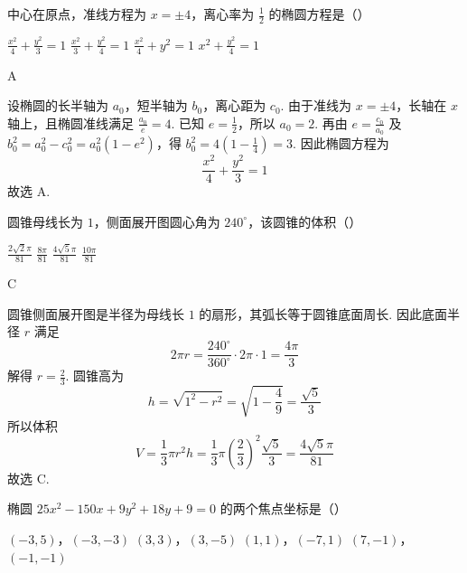 \begin{problem}
中心在原点，准线方程为 \(x = \pm 4\)，离心率为 \(\frac{1}{2}\) 的椭圆方程是（\quad）

\choices
    {\(\frac{x^2}{4} +\frac{y^2}{3} = 1\)}
    {\(\frac{x^2}{3} +\frac{y^2}{4} = 1\)}
    {\(\frac{x^2}{4} + y^2 = 1\)}
    {\(x^2 + \frac{y^2}{4} = 1\)}
\end{problem}

\begin{answer}
A
\end{answer}

\begin{solution}
设椭圆的长半轴为 \(a_0\)，短半轴为 \(b_0\)，离心距为 \(c_0\). 由于准线为 \(x=\pm4\)，长轴在 \(x\) 轴上，且椭圆准线满足 \(\frac{a_0}{e}=4\). 已知 \(e=\frac12\)，所以 \(a_0=2\). 再由 \(e=\frac{c_0}{a_0}\) 及 \(b_0^2=a_0^2-c_0^2=a_0^2(1-e^2)\)，得 \(b_0^2=4\left(1-\frac14\right)=3\). 因此椭圆方程为
\[
\frac{x^2}{4}+\frac{y^2}{3}=1
\]
故选 A.
\end{solution}

\begin{problem}
圆锥母线长为 \(1\)，侧面展开图圆心角为 \(240^{\circ}\)，该圆锥的体积（\quad）

\choices
    {\(\frac{2\sqrt{2}\pi}{81}\)}
    {\(\frac{8\pi}{81}\)}
    {\(\frac{4\sqrt{5}\pi}{81}\)}
    {\(\frac{10\pi}{81}\)}
\end{problem}

\begin{answer}
C
\end{answer}

\begin{solution}
圆锥侧面展开图是半径为母线长 \(1\) 的扇形，其弧长等于圆锥底面周长. 因此底面半径 \(r\) 满足
\[
2\pi r=\frac{240^{\circ}}{360^{\circ}}\cdot2\pi\cdot1=\frac{4\pi}{3}
\]
解得 \(r=\frac{2}{3}\). 圆锥高为
\[
h=\sqrt{1^2-r^2}=\sqrt{1-\frac{4}{9}}=\frac{\sqrt{5}}{3}
\]
所以体积
\[
V=\frac{1}{3}\pi r^2h=\frac{1}{3}\pi\left(\frac{2}{3}\right)^2\frac{\sqrt{5}}{3}=\frac{4\sqrt{5}\pi}{81}
\]
故选 C.
\end{solution}

\begin{problem}
椭圆 \(25x^{2} - 150x + 9y^{2} + 18y + 9 = 0\) 的两个焦点坐标是（\quad）

\choices
    {\(\left(-3, 5\right)\)，\(\left(-3, -3\right)\)}
    {\(\left(3, 3\right)\)，\(\left(3, -5\right)\)}
    {\(\left(1, 1\right)\)，\(\left(-7, 1\right)\)}
    {\(\left(7, -1\right)\)，\(\left(-1, -1\right)\)}
\end{problem}

